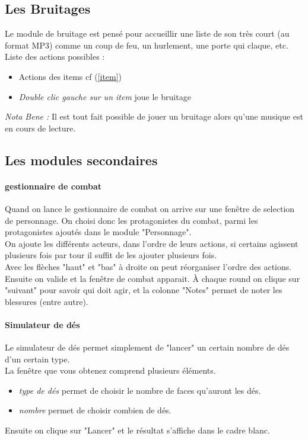 \documentclass[a4paper,12pt]{article}
\begin{document}
\subsection{Les Bruitages}\label{bruitage}
Le module de bruitage est pensé pour accueillir une liste de son très court (au format MP3) comme un coup de feu, un hurlement, une porte qui claque, etc.
\\
Liste des actions possibles :
\begin{itemize}
    \item Actions des items cf (\ref{item})
    \item \emph{Double clic gauche sur un item} joue le bruitage
\end{itemize}

\emph{Nota Bene :} Il est tout fait possible de jouer un bruitage alors qu'une musique est en cours de lecture.

\subsection{Les modules secondaires}
\paragraph{gestionnaire de combat}
Quand on lance le gestionnaire de combat on arrive sur une fenêtre de selection de personnage. On choisi donc les protagonistes du combat, parmi les protagonistes ajoutés dans le module "Personnage".
\\
On ajoute les différents acteurs, dans l'ordre de leurs actions, si certains agissent plusieurs fois par tour il suffit de les ajouter plusieurs fois.
\\
Avec les flèches "haut" et "bas" à droite on peut réorganiser l'ordre des actions.
\\
Ensuite on valide et la fenêtre de combat apparait. À chaque round on clique sur "suivant" pour savoir qui doit agir, et la colonne "Notes" permet de noter les blessures (entre autre).

\paragraph{Simulateur de dés}
Le simulateur de dés permet simplement de "lancer" un certain nombre de dés d'un certain type.
\\
La fenêtre que vous obtenez comprend plusieurs éléments.
\begin{itemize}
  \item  \emph{type de dés} permet de choisir le nombre de faces qu'auront les dés.
  \item \emph{nombre} permet de choisir combien de dés.
\end{itemize}
Ensuite on clique sur "Lancer" et le résultat s'affiche dans le cadre blanc.
\end{document}

